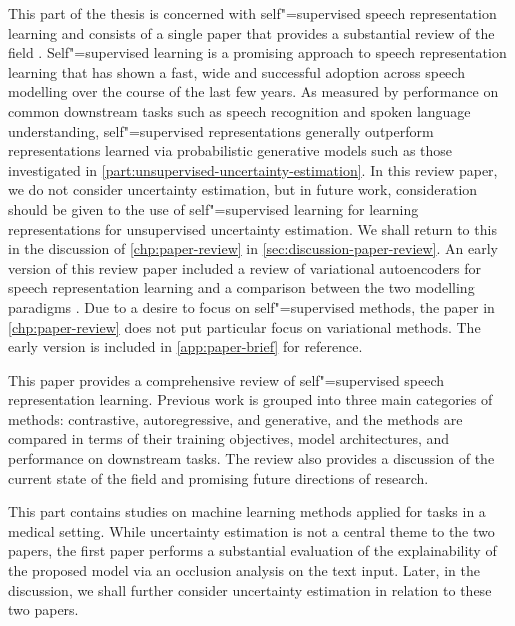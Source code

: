 This part of the thesis is concerned with self"=supervised speech representation learning and consists of a single paper that provides a substantial review of the field \parencite{mohamed_selfsupervised_2022}. 
Self"=supervised learning is a promising approach to speech representation learning that has shown a fast, wide and successful adoption across speech modelling over the course of the last few years. 
As measured by performance on common downstream tasks such as speech recognition and spoken language understanding, self"=supervised representations generally outperform representations learned via probabilistic generative models such as those investigated in \cref{part:unsupervised-uncertainty-estimation}. 
In this review paper, we do not consider uncertainty estimation, but in future work, consideration should be given to the use of self"=supervised learning for learning representations for unsupervised uncertainty estimation. We shall return to this in the discussion of \cref{chp:paper-review} in \cref{sec:discussion-paper-review}.
An early version of this review paper included a review of variational autoencoders for speech representation learning and a comparison between the two modelling paradigms \parencite{borgholt_brief_2022}. 
Due to a desire to focus on self"=supervised methods, the paper in \cref{chp:paper-review} does not put particular focus on variational methods. 
The early version is included in \cref{app:paper-brief} for reference.

This paper provides a comprehensive review of self"=supervised speech representation learning. Previous work is grouped into three main categories of methods: contrastive, autoregressive, and generative, and the methods are compared in terms of their training objectives, model architectures, and performance on downstream tasks. The review also provides a discussion of the current state of the field and promising future directions of research. 

 
This part contains studies on machine learning methods applied for tasks in a medical setting. While uncertainty estimation is not a central theme to the two papers, the first paper performs a substantial evaluation of the explainability of the proposed model via an occlusion analysis on the text input. Later, in the discussion, we shall further consider uncertainty estimation in relation to these two papers.

